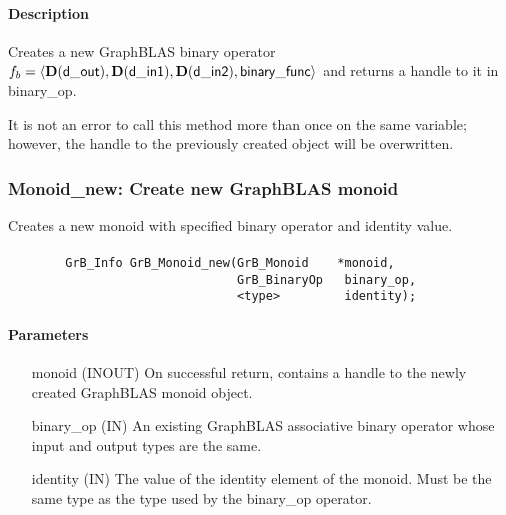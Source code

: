 \paragraph{Description}

Creates a new GraphBLAS binary operator $f_b = \langle \mathbf{D}({\sf d\_out}), 
\mathbf{D}({\sf d\_in1}), \mathbf{D}({\sf d\_in2}), {\sf binary\_func} \rangle$ and
returns a handle to it in {\sf binary\_op}.

It is not an error to call this method more than once on the same variable;  
however, the handle to the previously created object will be overwritten. 


\subsubsection{{\sf Monoid\_new}: Create new GraphBLAS monoid}

Creates a new monoid with specified binary operator and identity value.

\paragraph{\syntax}

\begin{verbatim}
        GrB_Info GrB_Monoid_new(GrB_Monoid    *monoid,
                                GrB_BinaryOp   binary_op,
                                <type>         identity);
\end{verbatim}

\paragraph{Parameters}

\begin{itemize}[leftmargin=1.1in]
    \item[{\sf monoid}] ({\sf INOUT}) On successful return, contains a
                         handle to the newly created GraphBLAS monoid object.
    \item[{\sf binary\_op}] ({\sf IN}) An existing GraphBLAS associative binary 
                         operator whose input and output types are the same.
    \item[{\sf identity}]  ({\sf IN}) The value of the identity element of the 
                         monoid. Must be the same type as the type used by the
                         {\sf binary\_op} operator.
\end{itemize}

